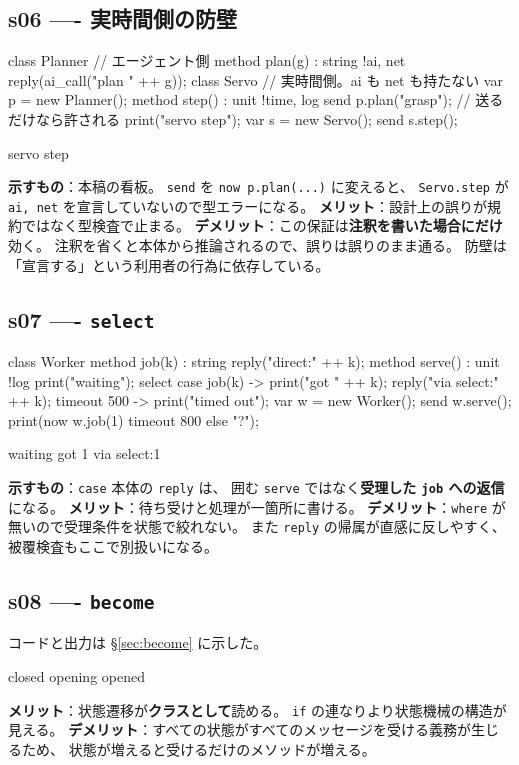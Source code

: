 \documentclass[11pt,a4paper]{ltjsarticle}
\theoremstyle{definition}
\theoremstyle{remark}
\begin{document}
\subsection{s06 ---- 実時間側の防壁}
\begin{aipl}
class Planner {                       // エージェント側
  method plan(g) : string !{ai, net} { reply(ai_call("plan " ++ g)); }
}
class Servo {                         // 実時間側。ai も net も持たない
  var p = new Planner();
  method step() : unit !{time, log} {
    send p.plan("grasp");             // 送るだけなら許される
    print("servo step");
  }
}
var s = new Servo();
send s.step();
\end{aipl}
\begin{term}
servo step
\end{term}
\textbf{示すもの}：本稿の看板。
\texttt{send} を \texttt{now p.plan(...)} に変えると、
\texttt{Servo.step} が \texttt{ai, net} を宣言していないので型エラーになる。
\textbf{メリット}：設計上の誤りが規約ではなく型検査で止まる。
\textbf{デメリット}：この保証は\textbf{注釈を書いた場合にだけ}効く。
注釈を省くと本体から推論されるので、誤りは誤りのまま通る。
防壁は「宣言する」という利用者の行為に依存している。

\subsection{s07 ---- \texttt{select}}
\begin{aipl}
class Worker {
  method job(k) : string { reply("direct:" ++ k); }
  method serve() : unit !{log} {
    print("waiting");
    select {
      case job(k) -> { print("got " ++ k); reply("via select:" ++ k); }
      timeout 500 -> { print("timed out"); }
    }
  }
}
var w = new Worker();
send w.serve();
print(now w.job(1) timeout 800 else "?");
\end{aipl}
\begin{term}
waiting
got 1
via select:1
\end{term}
\textbf{示すもの}：\texttt{case} 本体の \texttt{reply} は、
囲む \texttt{serve} ではなく\textbf{受理した \texttt{job} への返信}になる。
\textbf{メリット}：待ち受けと処理が一箇所に書ける。
\textbf{デメリット}：\texttt{where} が無いので受理条件を状態で絞れない。
また \texttt{reply} の帰属が直感に反しやすく、被覆検査もここで別扱いになる。

\subsection{s08 ---- \texttt{become}}
コードと出力は \S\ref{sec:become} に示した。
\begin{term}
closed
opening
opened
\end{term}
\textbf{メリット}：状態遷移が\textbf{クラスとして}読める。
\texttt{if} の連なりより状態機械の構造が見える。
\textbf{デメリット}：すべての状態がすべてのメッセージを受ける義務が生じるため、
状態が増えると受けるだけのメソッドが増える。
\end{document}
